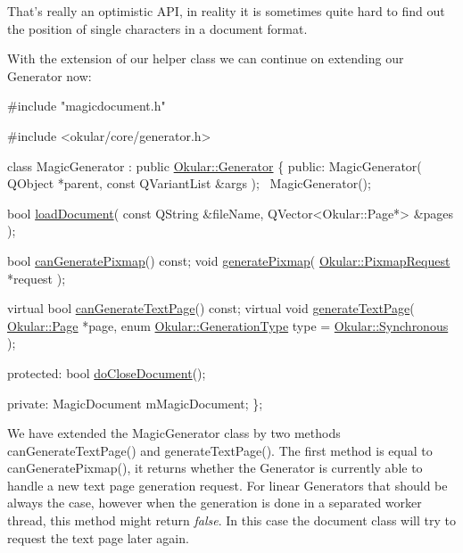 That's really an optimistic A\+P\+I, in reality it is sometimes quite hard to find out the position of single characters in a document format.

With the extension of our helper class we can continue on extending our Generator now\+:


\begin{DoxyCode}
\textcolor{preprocessor}{#include "magicdocument.h"}

\textcolor{preprocessor}{#include <okular/core/generator.h>}

\textcolor{keyword}{class }MagicGenerator : \textcolor{keyword}{public} \hyperlink{classOkular_1_1Generator}{Okular::Generator}
\{
    \textcolor{keyword}{public}:
        MagicGenerator( QObject *parent, \textcolor{keyword}{const} QVariantList &args );
        ~MagicGenerator();

        \textcolor{keywordtype}{bool} \hyperlink{classOkular_1_1Generator_a388b47328a5297d53cdbdc6fcf074ee3}{loadDocument}( \textcolor{keyword}{const} QString &fileName, QVector<Okular::Page*> &pages );

        \textcolor{keywordtype}{bool} \hyperlink{classOkular_1_1Generator_abbf00927221e2d2b2b71101f2b7f5732}{canGeneratePixmap}() \textcolor{keyword}{const};
        \textcolor{keywordtype}{void} \hyperlink{classOkular_1_1Generator_a198cdcd9c27b179562c935342fd457b6}{generatePixmap}( \hyperlink{classOkular_1_1PixmapRequest}{Okular::PixmapRequest} *request );

        \textcolor{keyword}{virtual} \textcolor{keywordtype}{bool} \hyperlink{classOkular_1_1Generator_a1f41d315daa0d2bd6831e0e7cd48d762}{canGenerateTextPage}() \textcolor{keyword}{const};
        \textcolor{keyword}{virtual} \textcolor{keywordtype}{void} \hyperlink{classOkular_1_1Generator_a1e2d8c81ac97ec012098c09047d2ddef}{generateTextPage}( \hyperlink{classOkular_1_1Page}{Okular::Page} *page, \textcolor{keyword}{enum} 
      \hyperlink{namespaceOkular_aefe2f23519d73b489219060219986007}{Okular::GenerationType} type = \hyperlink{namespaceOkular_aefe2f23519d73b489219060219986007a90d229125a62906242e5b3f5c8923d67}{Okular::Synchronous} );

    \textcolor{keyword}{protected}:
        \textcolor{keywordtype}{bool} \hyperlink{classOkular_1_1Generator_ad3f1dcb98f3bd87c87ad0e91ecf4a6d7}{doCloseDocument}();

    \textcolor{keyword}{private}:
        MagicDocument mMagicDocument;
\};
\end{DoxyCode}


We have extended the Magic\+Generator class by two methods can\+Generate\+Text\+Page() and generate\+Text\+Page(). The first method is equal to can\+Generate\+Pixmap(), it returns whether the Generator is currently able to handle a new text page generation request. For linear Generators that should be always the case, however when the generation is done in a separated worker thread, this method might return {\itshape false}. In this case the document class will try to request the text page later again.


